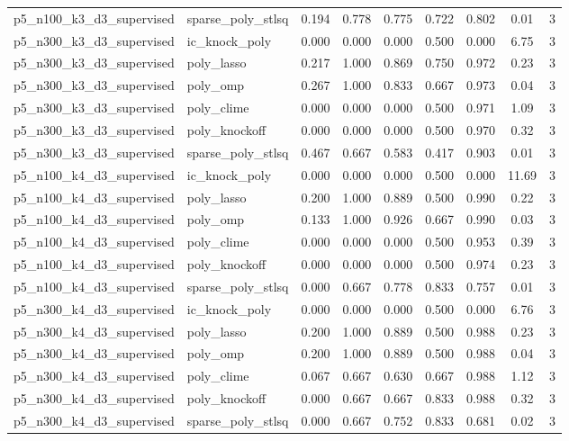 \documentclass[12pt,a4paper]{article}
\begin{document}
\begin{table}[htbp]
{\begin{tabular}{llccccccc}
  p5\_n100\_k3\_d3\_supervised & sparse\_poly\_stlsq & 0.194 & 0.778 & 0.775 & 0.722 & 0.802 & 0.01 & 3 \\
  p5\_n300\_k3\_d3\_supervised & ic\_knock\_poly & 0.000 & 0.000 & 0.000 & 0.500 & 0.000 & 6.75 & 3 \\
  p5\_n300\_k3\_d3\_supervised & poly\_lasso & 0.217 & 1.000 & 0.869 & 0.750 & 0.972 & 0.23 & 3 \\
  p5\_n300\_k3\_d3\_supervised & poly\_omp & 0.267 & 1.000 & 0.833 & 0.667 & 0.973 & 0.04 & 3 \\
  p5\_n300\_k3\_d3\_supervised & poly\_clime & 0.000 & 0.000 & 0.000 & 0.500 & 0.971 & 1.09 & 3 \\
  p5\_n300\_k3\_d3\_supervised & poly\_knockoff & 0.000 & 0.000 & 0.000 & 0.500 & 0.970 & 0.32 & 3 \\
  p5\_n300\_k3\_d3\_supervised & sparse\_poly\_stlsq & 0.467 & 0.667 & 0.583 & 0.417 & 0.903 & 0.01 & 3 \\
  p5\_n100\_k4\_d3\_supervised & ic\_knock\_poly & 0.000 & 0.000 & 0.000 & 0.500 & 0.000 & 11.69 & 3 \\
  p5\_n100\_k4\_d3\_supervised & poly\_lasso & 0.200 & 1.000 & 0.889 & 0.500 & 0.990 & 0.22 & 3 \\
  p5\_n100\_k4\_d3\_supervised & poly\_omp & 0.133 & 1.000 & 0.926 & 0.667 & 0.990 & 0.03 & 3 \\
  p5\_n100\_k4\_d3\_supervised & poly\_clime & 0.000 & 0.000 & 0.000 & 0.500 & 0.953 & 0.39 & 3 \\
  p5\_n100\_k4\_d3\_supervised & poly\_knockoff & 0.000 & 0.000 & 0.000 & 0.500 & 0.974 & 0.23 & 3 \\
  p5\_n100\_k4\_d3\_supervised & sparse\_poly\_stlsq & 0.000 & 0.667 & 0.778 & 0.833 & 0.757 & 0.01 & 3 \\
  p5\_n300\_k4\_d3\_supervised & ic\_knock\_poly & 0.000 & 0.000 & 0.000 & 0.500 & 0.000 & 6.76 & 3 \\
  p5\_n300\_k4\_d3\_supervised & poly\_lasso & 0.200 & 1.000 & 0.889 & 0.500 & 0.988 & 0.23 & 3 \\
  p5\_n300\_k4\_d3\_supervised & poly\_omp & 0.200 & 1.000 & 0.889 & 0.500 & 0.988 & 0.04 & 3 \\
  p5\_n300\_k4\_d3\_supervised & poly\_clime & 0.067 & 0.667 & 0.630 & 0.667 & 0.988 & 1.12 & 3 \\
  p5\_n300\_k4\_d3\_supervised & poly\_knockoff & 0.000 & 0.667 & 0.667 & 0.833 & 0.988 & 0.32 & 3 \\
  p5\_n300\_k4\_d3\_supervised & sparse\_poly\_stlsq & 0.000 & 0.667 & 0.752 & 0.833 & 0.681 & 0.02 & 3 \\
\hline
\end{tabular}%
}
\end{table}
\end{document}
